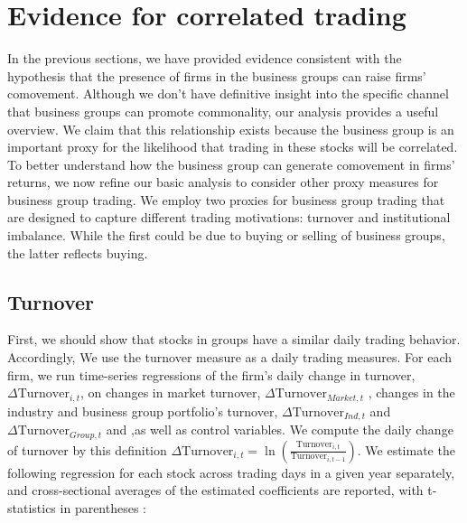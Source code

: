 \section{{Evidence for correlated trading} }


	In the previous sections, we have provided evidence consistent with the hypothesis that the presence of firms in the business groups can raise firms' comovement. Although we don't have definitive insight into the specific channel that business groups can promote commonality, our analysis provides a useful overview.
	We claim that this relationship exists because the business group is an important proxy for the likelihood that trading in these stocks will be correlated. To better understand how the business group can generate comovement in firms' returns, we now refine our basic analysis to consider other proxy measures for business group trading.
	We employ two proxies for business group trading that are designed to capture different trading motivations: turnover and institutional imbalance. While the first could be due to buying or selling of business groups, the latter reflects buying.

		\captionsetup[subtable]{labelformat=parens, font = small}
			\renewcommand{\thesubtable}{\Alph{subtable}}

\subsection{{Turnover}}


	First, we should show that stocks in groups have a similar daily trading behavior. Accordingly, We use the turnover measure as a daily trading measures. For each firm, we run time-series regressions of the firm's daily change in turnover, $ \Delta \text{Turnover}_{i,t} $, on changes in market turnover, $ \Delta\text{Turnover}_{Market,t}   $ , changes in the industry and business group portfolio's turnover, $ \Delta\text{Turnover}_{Ind,t} $ and  $\Delta \text{Turnover}_{Group,t} $ and  ,as well as control variables.
	We compute the daily change of turnover by this definition $ \Delta \text{Turnover}_{i,t} = \ln(\frac{\text{Turnover}_{i,t}}{\text{Turnover}_{i,t-1}}) $. 
	We estimate the following regression for each stock across trading days in a given year separately, and cross-sectional averages of the estimated coefficients are reported, with t-statistics in parentheses :
	
